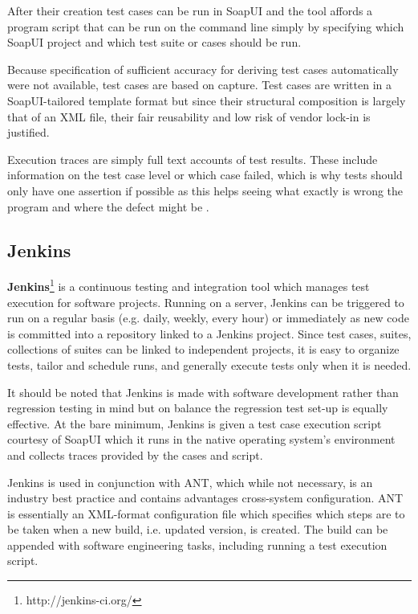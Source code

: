 \documentclass[12pt,a4paper,oneside,pdftex]{report}
\begin{document}
{{After their creation test cases can be run in SoapUI and the tool affords a program script that can be run on the command line simply by specifying which SoapUI project and which test suite or cases should be run.

Because specification of sufficient accuracy for deriving test cases automatically were not available, test cases are based on capture. Test cases are written in a SoapUI-tailored template format but since their structural composition is largely that of an XML file, their fair reusability and low risk of vendor lock-in is justified. 

Execution traces are simply full text accounts of test results. These include information on the test case level or which case failed, which is why tests should only have one assertion if possible as this helps seeing what exactly is wrong the program and where the defect might be \citep{duvall2007continuous}.

\subsection{Jenkins}

\textbf{Jenkins}\footnote{http://jenkins-ci.org/} is a continuous testing and integration tool which manages test execution for software projects. Running on a server, Jenkins can be triggered to run on a regular basis (e.g. daily, weekly, every hour) or immediately as new code is committed into a repository linked to a Jenkins project. Since test cases, suites, collections of suites can be linked to independent projects, it is easy to organize tests, tailor and schedule runs, and generally execute tests only when it is needed.

It should be noted that Jenkins is made with software development rather than regression testing in mind but on balance the regression test set-up is equally effective. At the bare minimum, Jenkins is given a test case execution script courtesy of SoapUI which it runs in the native operating system's environment and collects traces provided by the cases and script.

Jenkins is used in conjunction with ANT, which while not necessary, is an industry best practice and contains advantages cross-system configuration. ANT is essentially an XML-format configuration file which specifies which steps are to be taken when a new build, i.e. updated version, is created. The build can be appended with software engineering tasks, including running a test execution script. 

}}
\end{document}
